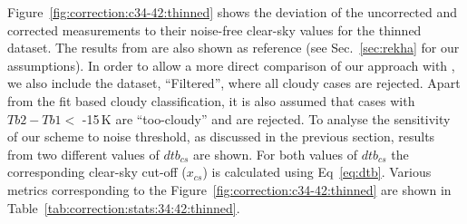\documentclass[12pt]{article}
\begin{document}
Figure~\ref{fig:correction:c34-42:thinned} shows the deviation of the uncorrected and
corrected measurements to their noise-free clear-sky values for the thinned dataset. The results from \cite{rekha2012potential} are also shown as reference (see Sec.~\ref{sec:rekha}
for our assumptions). In order to allow a more direct comparison of our
approach with \cite{rekha2012potential}, we also include the
dataset, ``Filtered'', where all cloudy cases are rejected. Apart from the fit
based cloudy classification, it is also assumed that cases with $Tb2-Tb1 < $
-15\,K are ``too-cloudy'' and are rejected.  To analyse the sensitivity of our scheme to noise threshold, as discussed in the previous section, results from two different values of $dtb_{cs}$ are shown. For both values of $dtb_{cs}$ the corresponding clear-sky cut-off
($x_{cs}$) is calculated using Eq~\ref{eq:dtb}. Various metrics corresponding to
the Figure~\ref{fig:correction:c34-42:thinned} are shown in
Table~\ref{tab:correction:stats:34:42:thinned}.
\end{document}
